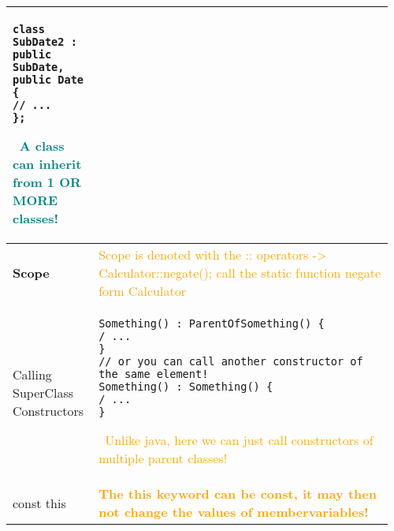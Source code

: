 \documentclass[main.tex,fontsize=8pt,paper=a4,paper=portrait,DIV=calc]{scrartcl}
\begin{document}
\begin{table}[ht!]
\begin{tabular}{|m{0.2\linewidth}|m{0.755\linewidth}|}
\begin{lstlisting}
class SubDate2 : public SubDate, public Date {
// ...
};
\end{lstlisting}
\, \newline
\textcolor{teal}{A class can inherit from 1 \textbf{OR MORE} classes!}\\
\hline
\textbf{Scope} & 
\textcolor{orange}{Scope is denoted with the :: operators -> Calculator::negate(); \newline call the static function negate form Calculator}\\
\hline
Calling SuperClass Constructors & 
\begin{lstlisting}
Something() : ParentOfSomething() {
/ ...
}
// or you can call another constructor of the same element!
Something() : Something() {
/ ...
}
\end{lstlisting}
\, \newline
\textcolor{orange}{Unlike java, here we can just call constructors of multiple parent classes!}\\
\hline
const this & 
\textcolor{orange}{\textbf{The this keyword can be const, it may then not change the values of membervariables!}}\\
\hline 
\end{tabular}
\end{table}
\pagebreak
\end{document}
